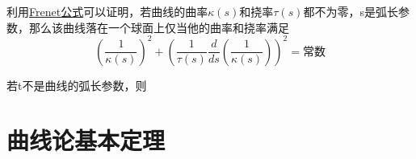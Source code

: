 \documentclass[12pt, a4paper, oneside]{ctexbook}
\newcounter{#2}
\newcounter{#2}[#1]
\numberwithin{#2}{#1}
\newcommand{\xkuo}[1]{\left(#1\right)}
\newcommand{\dao}[2]{\frac{d#1}{d#2}}
\begin{document}
            \begin{theorem}
                利用\href{fomular:Frenet}{Frenet公式}可以证明，若曲线的曲率\(\kappa(s)\)和挠率\(\tau(s)\)都不为零，s是弧长参数，那么该曲线落在一个球面上仅当他的曲率和挠率满足
                \begin{equation}
                    \xkuo{\frac{1}{\kappa(s)}}^2+\xkuo{\frac1{\tau(s)}\dao{}{s}\xkuo{\frac{1}{\kappa(s)}}}^2=\text{常数}
                \end{equation}
            \end{theorem}


            \begin{deduce}
                若t不是曲线的弧长参数，则
            \end{deduce}

            \begin{theorem}
                
            \end{theorem}

            \section{曲线论基本定理}




            
        
        
\end{document}
